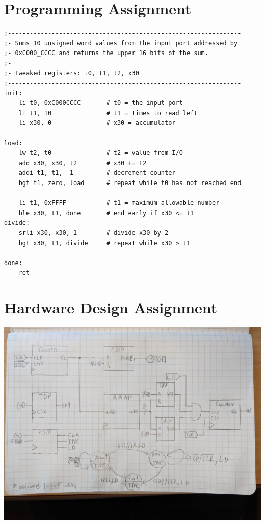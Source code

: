 \documentclass{article}
\begin{document}
\section{Programming Assignment}

\begin{verbatim}
;----------------------------------------------------------------
;- Sums 10 unsigned word values from the input port addressed by 
;- 0xC000_CCCC and returns the upper 16 bits of the sum.
;-
;- Tweaked registers: t0, t1, t2, x30
;----------------------------------------------------------------
init:
    li t0, 0xC000CCCC       # t0 = the input port
    li t1, 10               # t1 = times to read left
    li x30, 0               # x30 = accumulator

load:
    lw t2, t0               # t2 = value from I/O
    add x30, x30, t2        # x30 += t2
    addi t1, t1, -1         # decrement counter
    bgt t1, zero, load      # repeat while t0 has not reached end

    li t1, 0xFFFF           # t1 = maximum allowable number
    ble x30, t1, done       # end early if x30 <= t1
divide:
    srli x30, x30, 1        # divide x30 by 2
    bgt x30, t1, divide     # repeat while x30 > t1

done:
    ret
\end{verbatim}

\section{Hardware Design Assignment}

\includegraphics[width=\linewidth]{hw.jpg}
\end{document}
